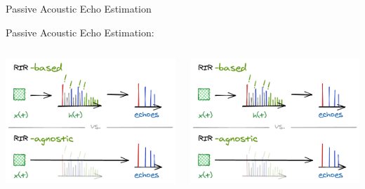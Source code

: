 \begin{frame}[t]{Passive Acoustic Echo Estimation}
\begin{block}{\alert{Passive} Acoustic Echo Estimation:}
        \vspace{.5em}
        \begin{columns}[onlytextwidth] %
            \begin{column}{.48\textwidth}
                \includegraphics[trim={0 31em 0 7em},clip,width=.9\textwidth]{./figures/based-agnostic.png}
            \end{column}
            \begin{column}{.48\textwidth}
                \includegraphics[trim={0 0 0 47em},clip,width=.9\textwidth]{./figures/based-agnostic.png}
            \end{column}%
        \end{columns}


\end{block}
\end{frame}
